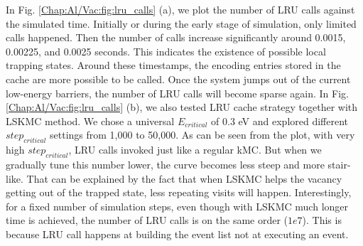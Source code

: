 In Fig. \ref{Chap:Al/Vac:fig:lru_calls} (a), we plot the number of \ac{LRU} calls against the simulated time. Initially or during the early stage of simulation, only limited calls happened. Then the number of calls increase significantly around 0.0015, 0.00225, and 0.0025 seconds. This indicates the existence of possible local trapping states. Around these timestamps, the encoding entries stored in the cache are more possible to be called. Once the system jumps out of the current low-energy barriers, the number of \ac{LRU} calls will become sparse again. In Fig. \ref{Chap:Al/Vac:fig:lru_calls} (b), we also tested \ac{LRU} cache strategy together with \ac{LSKMC} method. We chose a universal $E_{critical}$ of $0.3$ eV and explored different $step_{critical}$ settings from 1,000 to 50,000. As can be seen from the plot, with very high $step_{critical}$, \ac{LRU} calls invoked just like a regular \ac{kMC}. But when we gradually tune this number lower, the curve becomes less steep and more stair-like. That can be explained by the fact that when \ac{LSKMC} helps the vacancy getting out of the trapped state, less repeating visits will happen. Interestingly, for a fixed number of simulation steps, even though with \ac{LSKMC} much longer time is achieved, the number of \ac{LRU} calls is on the same order ($1e7$). This is because \ac{LRU} call happens at building the event list not at executing an event.

